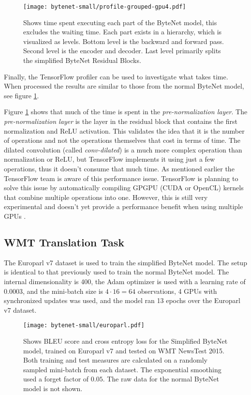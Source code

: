 \begin{figure}[h]
    \centering
    \texttt{[image: bytenet-small/profile-grouped-gpu4.pdf]}
    \caption{Shows time spent executing each part of the ByteNet model, this excludes the waiting time. Each part exists in a hierarchy, which is visualized as levels. Bottom level is the backward and forward pass. Second level is the encoder and decoder. Last level primarily splits the simplified ByteNet Residual Blocks.}
    \label{fig:result:simple-bytenet:profile-grouped}
\end{figure}

Finally, the TensorFlow profiler can be used to investigate what takes time. When processed the results are similar to those from the normal ByteNet model, see figure \ref{fig:result:simple-bytenet:profile-grouped}.

Figure \ref{fig:result:simple-bytenet:profile-grouped} shows that much of the time is spent in the \textit{pre-normalization layer}. The \textit{pre-normalization layer} is the layer in the residual block that contains the first normalization and ReLU activation. This validates the idea that it is the number of operations and not the operations themselves that cost in terms of time. The dilated convolution (called \textit{conv-dilated}) is a much more complex operation than normalization or ReLU, but TensorFlow implements it using just a few operations, thus it doesn't consume that much time. As mentioned earlier the TensorFlow team is aware of this performance issue. TensorFlow is planning to solve this issue by automatically compiling GPGPU (CUDA or OpenCL) kernels that combine multiple operations into one. However, this is still very experimental and doesn't yet provide a performance benefit when using multiple GPUs \cite{google-xla}.

\clearpage
\subsection{WMT Translation Task}

The Europarl v7 dataset is used to train the simplified ByteNet model. The setup is identical to that previously used to train the normal ByteNet model. The internal dimensionality is 400, the Adam optimizer is used with a learning rate of 0.0003, and the mini-batch size is $4 \cdot 16 = 64$ observations, 4 GPUs with synchronized updates was used, and the model ran 13 epochs over the Europarl v7 dataset.

\begin{figure}[h]
    \centering
    \texttt{[image: bytenet-small/europarl.pdf]}
    \caption{Shows BLEU score and cross entropy loss for the Simplified ByteNet model, trained on Europarl v7 and tested on WMT NewsTest 2015. Both training and test measures are calculated on a randomly sampled mini-batch from each dataset. The exponential smoothing used a forget factor of $0.05$. The raw data for the normal ByteNet model is not shown.}
    \label{fig:result:bytenet-small:europarl}
\end{figure}

